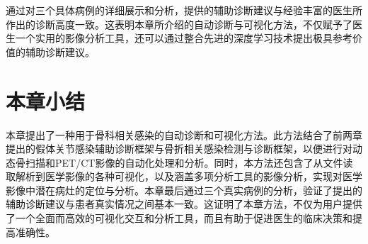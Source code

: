 通过对三个具体病例的详细展示和分析，提供的辅助诊断建议与经验丰富的医生所作出的诊断高度一致。这表明本章所介绍的自动诊断与可视化方法，不仅赋予了医生一个实用的影像分析工具，还可以通过整合先进的深度学习技术提出极具参考价值的辅助诊断建议。

\section{本章小结}

本章提出了一种用于骨科相关感染的自动诊断和可视化方法。此方法结合了前两章提出的假体关节感染辅助诊断框架与骨折相关感染检测与诊断框架，以便进行对动态骨扫描和PET/CT影像的自动化处理和分析。同时，本方法还包含了从文件读取解析到医学影像的各种可视化，以及涵盖多项分析工具的影像分析，实现对医学影像中潜在病灶的定位与分析。本章最后通过三个真实病例的分析，验证了提出的辅助诊断建议与患者真实情况之间基本一致。这证明了本章方法，不仅为用户提供了一个全面而高效的可视化交互和分析工具，而且有助于促进医生的临床决策和提高准确性。